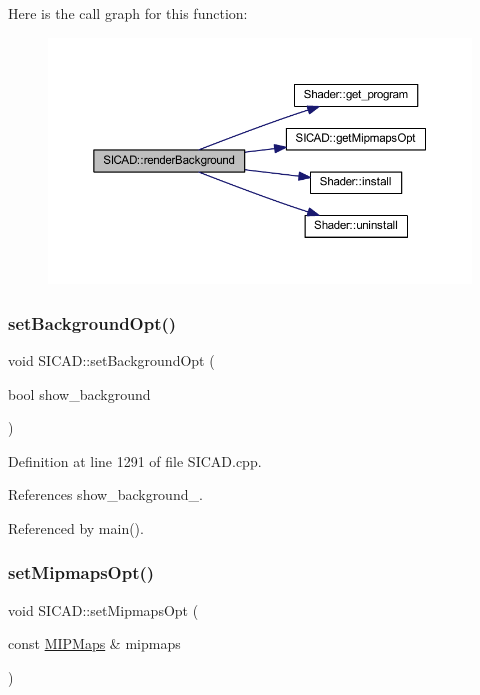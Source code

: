 Here is the call graph for this function\+:\nopagebreak
\begin{figure}[H]
\begin{center}
\leavevmode
\includegraphics[width=350pt]{classSICAD_a46fcf7ddb480a788463a4d98d26e12e8_cgraph}
\end{center}
\end{figure}
\mbox{\label{classSICAD_a07921943ad3d4016dcbe76135e799754}} 
\subsubsection{\texorpdfstring{set\+Background\+Opt()}{setBackgroundOpt()}}
{\footnotesize\ttfamily void S\+I\+C\+A\+D\+::set\+Background\+Opt (\begin{DoxyParamCaption}\item[{bool}]{show\+\_\+background }\end{DoxyParamCaption})}



Definition at line 1291 of file S\+I\+C\+A\+D.\+cpp.



References show\+\_\+background\+\_\+.



Referenced by main().

\mbox{\label{classSICAD_a1fa052a3609f52156b472e872e34971a}} 
\subsubsection{\texorpdfstring{set\+Mipmaps\+Opt()}{setMipmapsOpt()}}
{\footnotesize\ttfamily void S\+I\+C\+A\+D\+::set\+Mipmaps\+Opt (\begin{DoxyParamCaption}\item[{const \mbox{\hyperlink{classSICAD_a7e092dede6f660355462d6d548214198}{M\+I\+P\+Maps}} \&}]{mipmaps }\end{DoxyParamCaption})}



